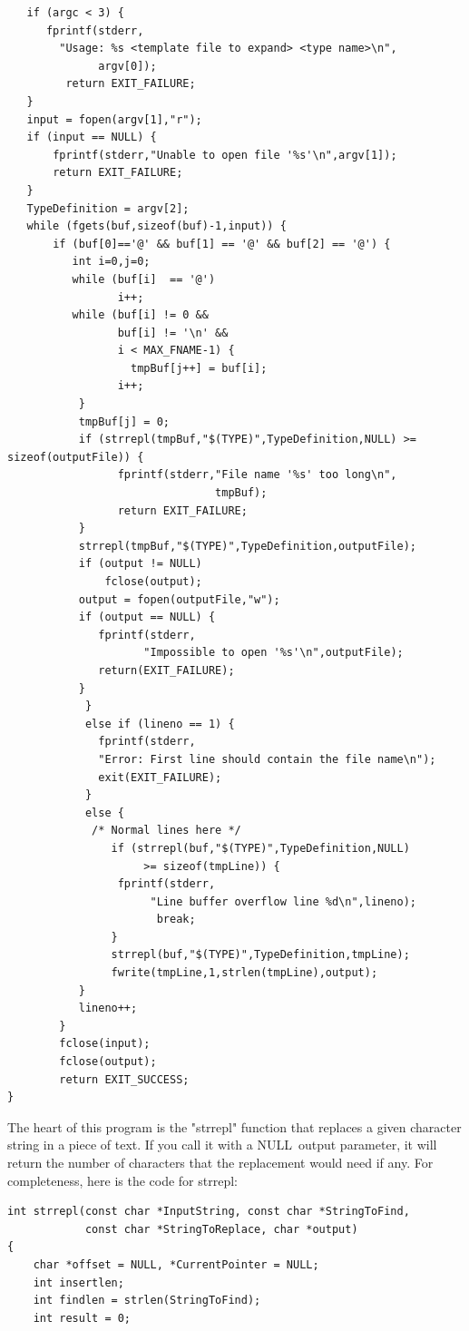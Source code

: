 \documentclass[12pt,a4paper,openany]{memoir} %
\newif\iftth
\newcommand{\Null}{{\iftth \ NULL \else \footnotesize NULL\  \fi}}
\begin{document}
{{\begin{verbatim}
   if (argc < 3) {
      fprintf(stderr,
        "Usage: %s <template file to expand> <type name>\n",
              argv[0]);
         return EXIT_FAILURE;
   }
   input = fopen(argv[1],"r");
   if (input == NULL) {
       fprintf(stderr,"Unable to open file '%s'\n",argv[1]);
       return EXIT_FAILURE;
   }
   TypeDefinition = argv[2];
   while (fgets(buf,sizeof(buf)-1,input)) {
       if (buf[0]=='@' && buf[1] == '@' && buf[2] == '@') {
          int i=0,j=0;
          while (buf[i]  == '@')
                 i++;
          while (buf[i] != 0 && 
                 buf[i] != '\n' && 
                 i < MAX_FNAME-1) {
                   tmpBuf[j++] = buf[i];
                 i++;
           }
           tmpBuf[j] = 0;
           if (strrepl(tmpBuf,"$(TYPE)",TypeDefinition,NULL) >= sizeof(outputFile)) {
                 fprintf(stderr,"File name '%s' too long\n",
                                tmpBuf);
                 return EXIT_FAILURE;
           }
           strrepl(tmpBuf,"$(TYPE)",TypeDefinition,outputFile);
           if (output != NULL)
               fclose(output);
           output = fopen(outputFile,"w");
           if (output == NULL) {
              fprintf(stderr,
                     "Impossible to open '%s'\n",outputFile);
              return(EXIT_FAILURE);
           }
            }
            else if (lineno == 1) {
              fprintf(stderr,
              "Error: First line should contain the file name\n");
              exit(EXIT_FAILURE);
            }
            else {
             /* Normal lines here */
                if (strrepl(buf,"$(TYPE)",TypeDefinition,NULL) 
                     >= sizeof(tmpLine)) {
                 fprintf(stderr,
                      "Line buffer overflow line %d\n",lineno);
                       break;
                }
                strrepl(buf,"$(TYPE)",TypeDefinition,tmpLine);
                fwrite(tmpLine,1,strlen(tmpLine),output);
           }
           lineno++;
        }
        fclose(input);
        fclose(output);
        return EXIT_SUCCESS;
}
\end{verbatim}
The heart of this program is the "strrepl" function that replaces a given character string in a piece of text. If you call it with a \Null output parameter, it will return the number of characters that the replacement would need if any. For completeness, here is the code for strrepl:
\begin{verbatim}
int strrepl(const char *InputString, const char *StringToFind,
            const char *StringToReplace, char *output)
{
    char *offset = NULL, *CurrentPointer = NULL;
    int insertlen;
    int findlen = strlen(StringToFind);
    int result = 0;


\end{verbatim}}}
\end{document}

